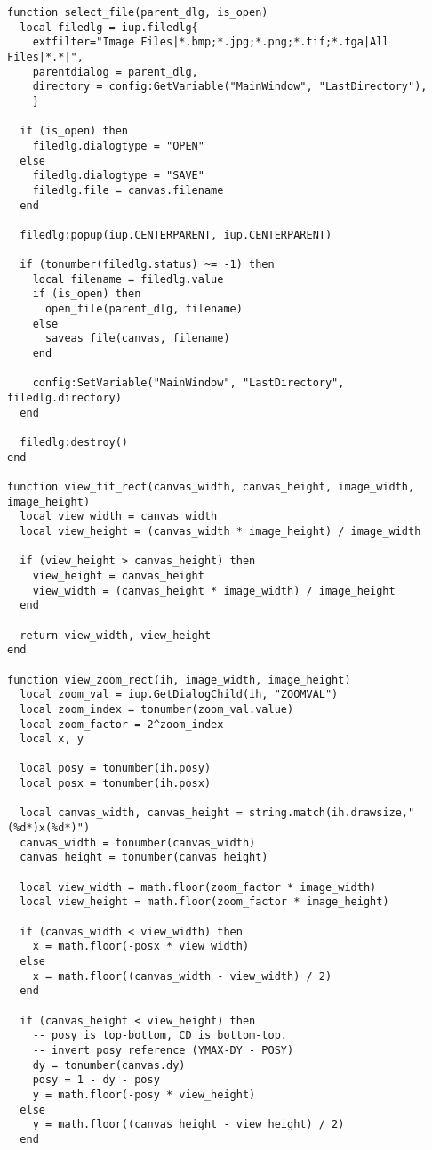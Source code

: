 \documentclass{ctexart}
\begin{document}
\begin{lstlisting}
function select_file(parent_dlg, is_open)
  local filedlg = iup.filedlg{
    extfilter="Image Files|*.bmp;*.jpg;*.png;*.tif;*.tga|All Files|*.*|",
    parentdialog = parent_dlg,
    directory = config:GetVariable("MainWindow", "LastDirectory"),
    }
    
  if (is_open) then
    filedlg.dialogtype = "OPEN"
  else
    filedlg.dialogtype = "SAVE"
    filedlg.file = canvas.filename
  end

  filedlg:popup(iup.CENTERPARENT, iup.CENTERPARENT)
  
  if (tonumber(filedlg.status) ~= -1) then
    local filename = filedlg.value
    if (is_open) then
      open_file(parent_dlg, filename)
    else
      saveas_file(canvas, filename)    
    end

    config:SetVariable("MainWindow", "LastDirectory", filedlg.directory)
  end
  
  filedlg:destroy()
end

function view_fit_rect(canvas_width, canvas_height, image_width, image_height)
  local view_width = canvas_width
  local view_height = (canvas_width * image_height) / image_width

  if (view_height > canvas_height) then 
    view_height = canvas_height
    view_width = (canvas_height * image_width) / image_height
  end
  
  return view_width, view_height
end

function view_zoom_rect(ih, image_width, image_height)
  local zoom_val = iup.GetDialogChild(ih, "ZOOMVAL")
  local zoom_index = tonumber(zoom_val.value)
  local zoom_factor = 2^zoom_index
  local x, y

  local posy = tonumber(ih.posy)
  local posx = tonumber(ih.posx)
  
  local canvas_width, canvas_height = string.match(ih.drawsize,"(%d*)x(%d*)")
  canvas_width = tonumber(canvas_width)
  canvas_height = tonumber(canvas_height)

  local view_width = math.floor(zoom_factor * image_width)
  local view_height = math.floor(zoom_factor * image_height)

  if (canvas_width < view_width) then
    x = math.floor(-posx * view_width)
  else
    x = math.floor((canvas_width - view_width) / 2)
  end

  if (canvas_height < view_height) then
    -- posy is top-bottom, CD is bottom-top.
    -- invert posy reference (YMAX-DY - POSY)
    dy = tonumber(canvas.dy)
    posy = 1 - dy - posy
    y = math.floor(-posy * view_height)
  else
    y = math.floor((canvas_height - view_height) / 2)
  end


\end{lstlisting}
\end{document}
